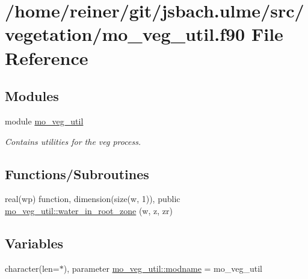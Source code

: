 \hypertarget{mo__veg__util_8f90}{}\section{/home/reiner/git/jsbach.ulme/src/vegetation/mo\+\_\+veg\+\_\+util.f90 File Reference}
\label{mo__veg__util_8f90}
\subsection*{Modules}
\begin{DoxyCompactItemize}
\item 
module \hyperlink{namespacemo__veg__util}{mo\+\_\+veg\+\_\+util}
\begin{DoxyCompactList}\small\item\em Contains utilities for the veg process. \end{DoxyCompactList}\end{DoxyCompactItemize}
\subsection*{Functions/\+Subroutines}
\begin{DoxyCompactItemize}
\item 
real(wp) function, dimension(size(w, 1)), public \hyperlink{namespacemo__veg__util_af6216ea4cafe0107cd77fd3774c1b948}{mo\+\_\+veg\+\_\+util\+::water\+\_\+in\+\_\+root\+\_\+zone} (w, z, zr)
\end{DoxyCompactItemize}
\subsection*{Variables}
\begin{DoxyCompactItemize}
\item 
character(len=$\ast$), parameter \hyperlink{namespacemo__veg__util_a7c115cfdb9def27cc2cb0f8a8332485f}{mo\+\_\+veg\+\_\+util\+::modname} = \textquotesingle{}mo\+\_\+veg\+\_\+util\textquotesingle{}
\end{DoxyCompactItemize}
